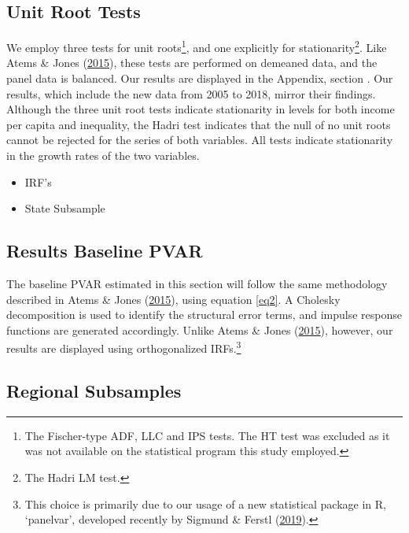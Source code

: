 \documentclass[11pt,preprint, authoryear]{elsarticle}
\numberwithin{equation}{section}
\numberwithin{figure}{section}
\numberwithin{table}{section}
\let\rmarkdownfootnote\footnote%
\def\footnote{\protect\rmarkdownfootnote}
\begin{document}
\hypertarget{unit-root-tests}{%
\subsection{\texorpdfstring{Unit Root Tests
\label{Section 3.2}}{Unit Root Tests }}\label{unit-root-tests}}

We employ three tests for unit roots\footnote{The Fischer-type ADF, LLC
  and IPS tests. The HT test was excluded as it was not available on the
  statistical program this study employed.}, and one explicitly for
stationarity\footnote{The Hadri LM test.}. Like Atems \& Jones
(\protect\hyperlink{ref-atems}{2015}), these tests are performed on
demeaned data, and the panel data is balanced. Our results are displayed
in the Appendix, section . Our results, which include the new
data from 2005 to 2018, mirror their findings. Although the three unit
root tests indicate stationarity in levels for both income per capita
and inequality, the Hadri test indicates that the null of no unit roots
cannot be rejected for the series of both variables. All tests indicate
stationarity in the growth rates of the two variables.

\begin{itemize}
\item
  IRF's
\item
  State Subsample
\end{itemize}

\hypertarget{results-baseline-pvar}{%
\subsection{\texorpdfstring{Results Baseline PVAR
\label{Section 3.3}}{Results Baseline PVAR }}\label{results-baseline-pvar}}

The baseline PVAR estimated in this section will follow the same
methodology described in Atems \& Jones
(\protect\hyperlink{ref-atems}{2015}), using equation \ref{eq2}. A
Cholesky decomposition is used to identify the structural error terms,
and impulse response functions are generated accordingly. Unlike Atems
\& Jones (\protect\hyperlink{ref-atems}{2015}), however, our results are
displayed using orthogonalized IRFs.\footnote{This choice is primarily
  due to our usage of a new statistical package in R, `panelvar',
  developed recently by Sigmund \& Ferstl
  (\protect\hyperlink{ref-sigmund2019panel}{2019}).}

\hypertarget{regional-subsamples}{%
\subsection{\texorpdfstring{Regional Subsamples
\label{Section 3.4}}{Regional Subsamples }}\label{regional-subsamples}}
\end{document}
